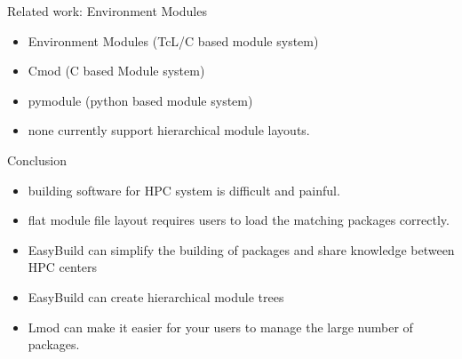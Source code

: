 \documentclass[10pt,xcolor={usenames,dvipsnames}]{beamer}
\begin{document}

\begin{frame}{Related work: Environment Modules}
\begin{itemize}
    \item Environment Modules (TcL/C based module system)
    \item Cmod (C based Module system)
    \item pymodule (python based module system)
    \item none currently support hierarchical module layouts.
\end{itemize}
\end{frame}


\begin{frame}{Conclusion}
\begin{itemize}
    \item building software for HPC system is difficult and painful.
    \item flat module file layout requires users to load the matching
      packages correctly.
    \item EasyBuild can simplify the building of packages and
      share knowledge between HPC centers
    \item EasyBuild can create hierarchical module trees
    \item Lmod can make it easier for your users to manage the large
      number of packages.
\end{itemize}
\end{frame}
\end{document}
